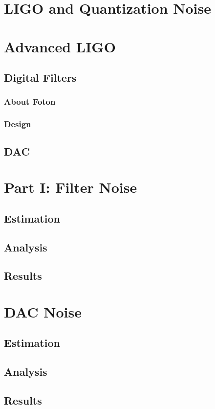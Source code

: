 \section{LIGO and Quantization Noise}
\section{Advanced LIGO}
	\subsection{Digital Filters}
	    \subsubsection{About Foton} 
    		\subsubsection{Design}
	\subsection{DAC}


\section{Part I: Filter Noise}
	\subsection{Estimation}
	\subsection{Analysis}
	\subsection{Results}
\section{DAC Noise}
	\subsection{Estimation}
	\subsection{Analysis}
    \subsection{Results}
